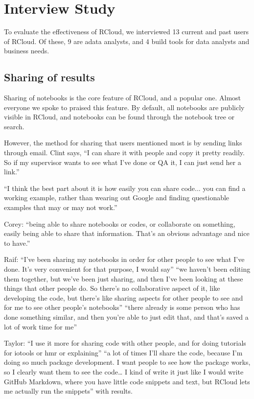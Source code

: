 \section{Interview Study\label{sec:interviews}}

To evaluate the effectiveness of RCloud, we interviewed 13 current and past
users of RCloud. Of these, 9 are adata analysts, and 4 build tools for data
analysts and business needs.



\subsection{Sharing of results}
Sharing of notebooks is the core feature of RCloud, and a popular one. Almost
everyone we spoke to praised this feature. By default, all notebooks are
publicly visible in RCloud, and notebooks can be found through the notebook tree
or search.

However, the method for sharing that users mentioned most is by sending links
through email. Clint says, ``I can share it with people and copy it pretty
readily. So if my supervisor wants to see what I've done or QA it, I can just
send her a link.''

``I think the best part about it is how easily you can share code... you can
find a working example, rather than wearing out Google and finding questionable
examples that may or may not work.''

Corey: ``being able to share notebooks or codes, or collaborate on something,
easily being able to share that information. That's an obvious advantage and
nice to have.''

Raif: ``I've been sharing my notebooks in order for other people to see what
I've done. It's very convenient for that purpose, I would say'' ``we haven't
been editing them together, but we've been just sharing, and then I've been
looking at these things that other people do. So there's no collaborative aspect
of it, like developing the code, but there's like sharing aspects for other
people to see and for me to see other people's notebooks'' ``there already is
some person who has done something similar, and then you're able to just edit
that, and that's saved a lot of work time for me''

Taylor: ``I use it more for sharing code with other people, and for doing
tutorials for iotools or hmr or explaining'' ``a lot of times I'll share the
code, because I'm doing so much package development. I want people to see how
the package works, so I clearly want them to see the code… I kind of write it
just like I would write GitHub Markdown, where you have little code snippets and
text, but RCloud lets me actually run the snippets'' with results.

